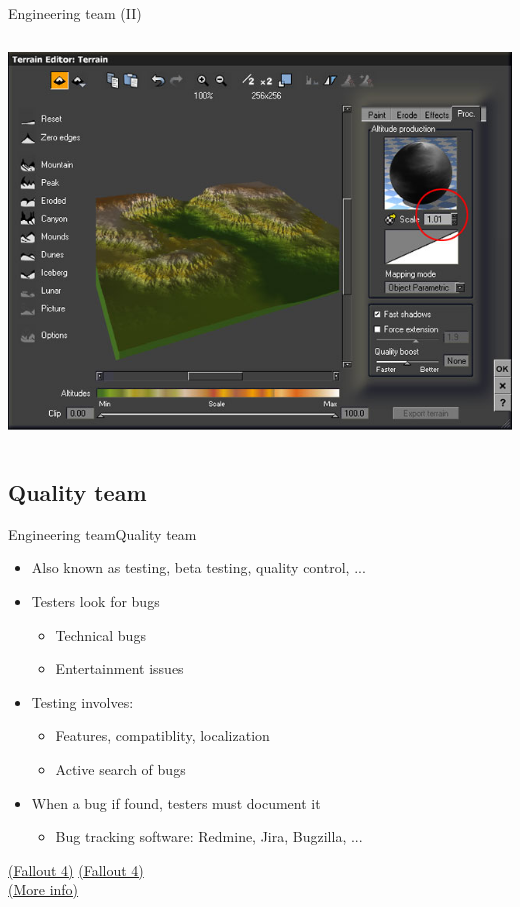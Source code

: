 \documentclass[10pt,compress]{beamer} %
\begin{document}
\begin{frame}[plain]{Engineering team (II)}
\begin{columns}
		\centering\includegraphics[width=\linewidth]{figs/geocontrol07}
		\end{columns}
\end{frame}

\subsection[Quality team]{Quality team}
\begin{frame}{Engineering team}{Quality team}
	\begin{itemize}
		\item Also known as testing, beta testing, quality control, ...
		\item Testers look for bugs
			\begin{itemize}
				\item Technical bugs
				\item Entertainment issues
			\end{itemize}
		\item Testing involves:
			\begin{itemize}
				\item Features, compatiblity, localization
				\item Active search of bugs
			\end{itemize}
		\item When a bug if found, testers must document it
			\begin{itemize}
				\item Bug tracking software: Redmine, Jira, Bugzilla, ...
			\end{itemize}
	\end{itemize}
    \href{https://www.youtube.com/watch?v=eVb_hgMeSDM}{(Fallout 4)} \href{https://fallout.fandom.com/wiki/Test_cell_for_traps}{(Fallout 4)}\\
	\href{http://en.wikipedia.org/wiki/Game\_testing}{(More info)}
\end{frame}
\end{document}
